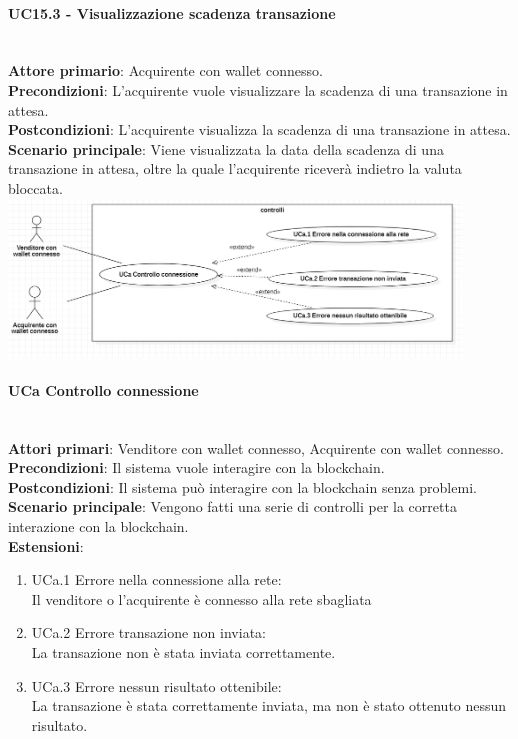 \documentclass[a4paper, 12pt]{article}
\begin{document}
\paragraph{UC15.3 - Visualizzazione scadenza transazione}\\
\textbf{Attore primario}: Acquirente  con wallet connesso.\\
\textbf{Precondizioni}: L'acquirente vuole visualizzare la scadenza di una transazione in attesa.\\
\textbf{Postcondizioni}: L'acquirente visualizza la scadenza di una transazione in attesa.\\
\textbf{Scenario principale}: Viene visualizzata la data della scadenza di una transazione in attesa, oltre la quale l'acquirente riceverà indietro la valuta bloccata.\\

\includegraphics[width=0.9\textwidth]{UC_controlli}

\paragraph{UCa Controllo connessione}\\
\textbf{Attori primari}: Venditore con wallet connesso, Acquirente con wallet connesso. \\
\textbf{Precondizioni}: Il sistema vuole interagire con la blockchain.\\
\textbf{Postcondizioni}:  Il sistema può interagire con la blockchain senza problemi.\\
\textbf{Scenario principale}:
Vengono fatti una serie di controlli per la corretta interazione con la blockchain.\\
\textbf{Estensioni}:
\begin{enumerate}
    \item UCa.1 Errore nella connessione alla rete:\\
        Il venditore o l'acquirente è connesso alla rete sbagliata
    \item UCa.2 Errore transazione non inviata:\\
        La transazione non è stata inviata correttamente.
    \item UCa.3 Errore nessun risultato ottenibile:\\
        La transazione è stata correttamente inviata, ma non è stato ottenuto nessun risultato.
\end{enumerate}
\end{document}
